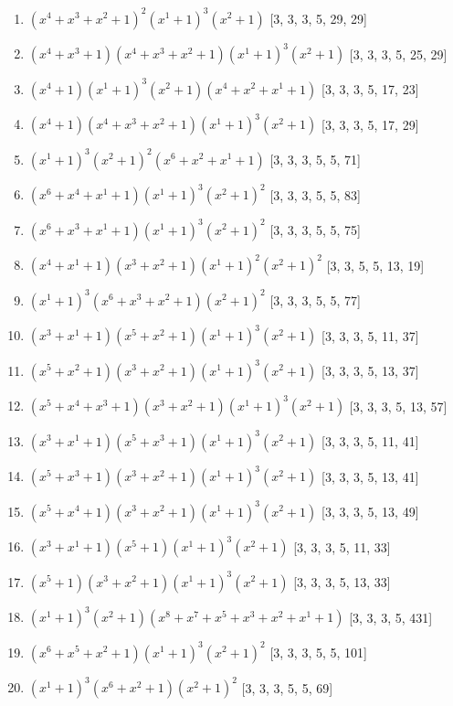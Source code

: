 \documentclass[10pt,twocolumn]{article}
\begin{document}
\begin{enumerate}
\item $(x^{4} + x^{3} + x^{2} + 1)^{2}(x^{1} + 1)^{3}(x^{2} + 1)$  [3, 3, 3, 5, 29, 29]
\item $(x^{4} + x^{3} + 1)(x^{4} + x^{3} + x^{2} + 1)(x^{1} + 1)^{3}(x^{2} + 1)$  [3, 3, 3, 5, 25, 29]
\item $(x^{4} + 1)(x^{1} + 1)^{3}(x^{2} + 1)(x^{4} + x^{2} + x^{1} + 1)$  [3, 3, 3, 5, 17, 23]
\item $(x^{4} + 1)(x^{4} + x^{3} + x^{2} + 1)(x^{1} + 1)^{3}(x^{2} + 1)$  [3, 3, 3, 5, 17, 29]
\item $(x^{1} + 1)^{3}(x^{2} + 1)^{2}(x^{6} + x^{2} + x^{1} + 1)$  [3, 3, 3, 5, 5, 71]
\item $(x^{6} + x^{4} + x^{1} + 1)(x^{1} + 1)^{3}(x^{2} + 1)^{2}$  [3, 3, 3, 5, 5, 83]
\item $(x^{6} + x^{3} + x^{1} + 1)(x^{1} + 1)^{3}(x^{2} + 1)^{2}$  [3, 3, 3, 5, 5, 75]
\item $(x^{4} + x^{1} + 1)(x^{3} + x^{2} + 1)(x^{1} + 1)^{2}(x^{2} + 1)^{2}$  [3, 3, 5, 5, 13, 19]
\item $(x^{1} + 1)^{3}(x^{6} + x^{3} + x^{2} + 1)(x^{2} + 1)^{2}$  [3, 3, 3, 5, 5, 77]
\item $(x^{3} + x^{1} + 1)(x^{5} + x^{2} + 1)(x^{1} + 1)^{3}(x^{2} + 1)$  [3, 3, 3, 5, 11, 37]
\item $(x^{5} + x^{2} + 1)(x^{3} + x^{2} + 1)(x^{1} + 1)^{3}(x^{2} + 1)$  [3, 3, 3, 5, 13, 37]
\item $(x^{5} + x^{4} + x^{3} + 1)(x^{3} + x^{2} + 1)(x^{1} + 1)^{3}(x^{2} + 1)$  [3, 3, 3, 5, 13, 57]
\item $(x^{3} + x^{1} + 1)(x^{5} + x^{3} + 1)(x^{1} + 1)^{3}(x^{2} + 1)$  [3, 3, 3, 5, 11, 41]
\item $(x^{5} + x^{3} + 1)(x^{3} + x^{2} + 1)(x^{1} + 1)^{3}(x^{2} + 1)$  [3, 3, 3, 5, 13, 41]
\item $(x^{5} + x^{4} + 1)(x^{3} + x^{2} + 1)(x^{1} + 1)^{3}(x^{2} + 1)$  [3, 3, 3, 5, 13, 49]
\item $(x^{3} + x^{1} + 1)(x^{5} + 1)(x^{1} + 1)^{3}(x^{2} + 1)$  [3, 3, 3, 5, 11, 33]
\item $(x^{5} + 1)(x^{3} + x^{2} + 1)(x^{1} + 1)^{3}(x^{2} + 1)$  [3, 3, 3, 5, 13, 33]
\item $(x^{1} + 1)^{3}(x^{2} + 1)(x^{8} + x^{7} + x^{5} + x^{3} + x^{2} + x^{1} + 1)$  [3, 3, 3, 5, 431]
\item $(x^{6} + x^{5} + x^{2} + 1)(x^{1} + 1)^{3}(x^{2} + 1)^{2}$  [3, 3, 3, 5, 5, 101]
\item $(x^{1} + 1)^{3}(x^{6} + x^{2} + 1)(x^{2} + 1)^{2}$  [3, 3, 3, 5, 5, 69]

\end{enumerate}
\end{document}
